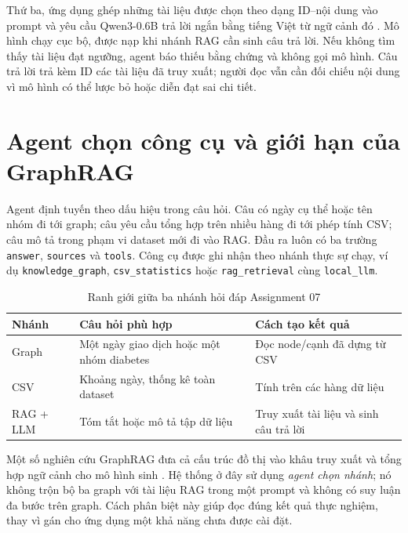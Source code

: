 \documentclass[12pt,a4paper]{report}
\begin{document}
Thứ ba, ứng dụng ghép những tài liệu được chọn theo dạng ID--nội dung vào prompt và yêu cầu
Qwen3-0.6B trả lời ngắn bằng tiếng Việt từ ngữ cảnh đó \cite{essay03-qwen}. Mô hình chạy cục bộ,
được nạp khi nhánh RAG cần sinh câu trả lời. Nếu không tìm thấy tài liệu đạt ngưỡng, agent báo thiếu
bằng chứng và không gọi mô hình. Câu trả lời trả kèm ID các tài liệu đã truy xuất; người đọc vẫn cần
đối chiếu nội dung vì mô hình có thể lược bỏ hoặc diễn đạt sai chi tiết.

\section{Agent chọn công cụ và giới hạn của GraphRAG}
Agent định tuyến theo dấu hiệu trong câu hỏi. Câu có ngày cụ thể hoặc tên nhóm đi tới graph;
câu yêu cầu tổng hợp trên nhiều hàng đi tới phép tính CSV; câu mô tả trong phạm vi dataset mới
đi vào RAG. Đầu ra luôn có ba trường \texttt{answer}, \texttt{sources} và \texttt{tools}. Công cụ
được ghi nhận theo nhánh thực sự chạy, ví dụ \texttt{knowledge\_graph},
\texttt{csv\_statistics} hoặc \texttt{rag\_retrieval} cùng \texttt{local\_llm}.

\begin{table}[htbp]\centering\color{red}
\caption{Ranh giới giữa ba nhánh hỏi đáp Assignment 07}\label{tab:essay03-agent}
\begin{tabularx}{\textwidth}{>{\raggedright\arraybackslash}p{2.4cm}>{\raggedright\arraybackslash}X>{\raggedright\arraybackslash}X}
\toprule
\textbf{Nhánh} & \textbf{Câu hỏi phù hợp} & \textbf{Cách tạo kết quả}\\
\midrule
Graph & Một ngày giao dịch hoặc một nhóm diabetes & Đọc node/cạnh đã dựng từ CSV\\
CSV & Khoảng ngày, thống kê toàn dataset & Tính trên các hàng dữ liệu\\
RAG + LLM & Tóm tắt hoặc mô tả tập dữ liệu & Truy xuất tài liệu và sinh câu trả lời\\
\bottomrule
\end{tabularx}
\end{table}

Một số nghiên cứu GraphRAG đưa cả cấu trúc đồ thị vào khâu truy xuất và tổng hợp ngữ cảnh cho
mô hình sinh \cite{essay03-graphrag}. Hệ thống ở đây sử dụng \emph{agent chọn nhánh}; nó không
trộn bộ ba graph với tài liệu RAG trong một prompt và không có suy luận đa bước trên graph.
Cách phân biệt này giúp đọc đúng kết quả thực nghiệm, thay vì gán cho ứng dụng một khả năng chưa
được cài đặt.
\end{document}

